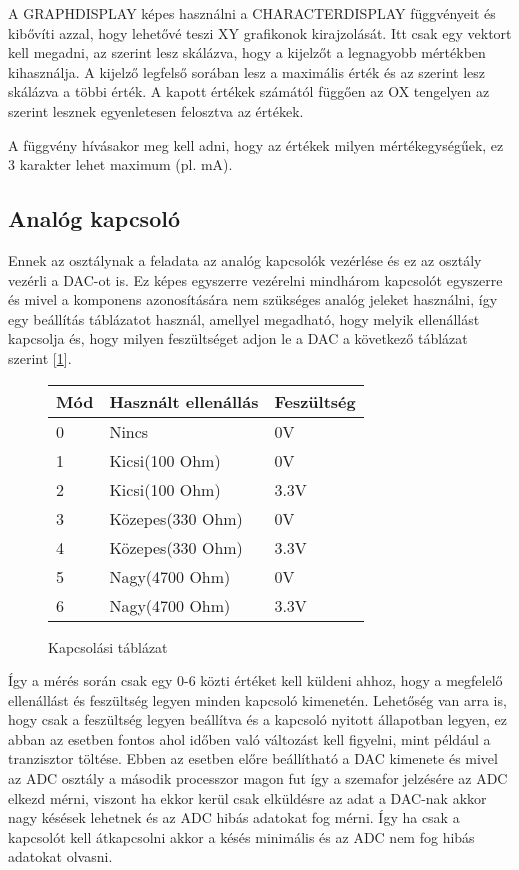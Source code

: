 A GRAPHDISPLAY képes használni a CHARACTERDISPLAY függvényeit és kibővíti azzal,
hogy lehetővé teszi XY grafikonok kirajzolását. Itt csak egy vektort kell megadni,
az szerint lesz skálázva, hogy a kijelzőt a legnagyobb mértékben kihasználja.
A kijelző legfelső sorában lesz a maximális érték és az szerint lesz skálázva a
többi érték. A kapott értékek számától függően az OX tengelyen az szerint lesznek
egyenletesen felosztva az értékek.

A függvény hívásakor meg kell adni, hogy az értékek milyen mértékegységűek, ez 3
karakter lehet maximum (pl. mA). 



\subsection{Analóg kapcsoló}

Ennek az osztálynak a feladata az analóg kapcsolók vezérlése és ez az
osztály vezérli a DAC-ot is. Ez képes egyszerre vezérelni mindhárom kapcsolót
egyszerre és mivel a komponens azonosítására nem szükséges analóg jeleket
használni, így egy beállítás táblázatot használ, amellyel megadható, hogy 
melyik ellenállást kapcsolja és, hogy milyen feszültséget adjon le a DAC
a következő táblázat szerint [\ref{fig:KapcsoloMod}].

\begin{figure}[H]
    \centering
    \begin{tabular}{|l|l|l|}
    \hline
    Mód & Használt ellenállás & Feszültség \\ \hline
    0   & Nincs               & 0V         \\ \hline
    1   & Kicsi(100 Ohm)      & 0V         \\ \hline
    2   & Kicsi(100 Ohm)      & 3.3V       \\ \hline
    3   & Közepes(330 Ohm)    & 0V         \\ \hline
    4   & Közepes(330 Ohm)    & 3.3V       \\ \hline
    5   & Nagy(4700 Ohm)      & 0V         \\ \hline
    6   & Nagy(4700 Ohm)      & 3.3V       \\ \hline
\end{tabular}
\caption{Kapcsolási táblázat}
\label{fig:KapcsoloMod}
\end{figure}

Így a mérés során csak egy 0-6 közti értéket kell küldeni 
ahhoz, hogy a megfelelő ellenállást és feszültség legyen
minden kapcsoló kimenetén. Lehetőség van arra is, hogy csak 
a feszültség legyen beállítva és a kapcsoló nyitott állapotban legyen,
ez abban az esetben fontos ahol időben való változást kell figyelni,
mint például a tranzisztor töltése. Ebben az esetben előre 
beállítható a DAC kimenete és mivel az ADC osztály a második
processzor magon fut így a szemafor jelzésére az ADC elkezd mérni, 
viszont ha ekkor kerül csak elküldésre az adat a DAC-nak akkor 
nagy késések lehetnek és az ADC hibás adatokat fog mérni.
Így ha csak a kapcsolót kell átkapcsolni akkor a késés minimális és az ADC
nem fog hibás adatokat olvasni.

